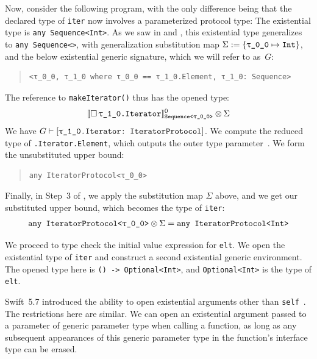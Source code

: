 \documentclass[../generics]{subfiles}
\begin{document}
\begin{example}
Now, consider the following program, with the only difference being that the declared type of \texttt{iter} now involves a parameterized protocol type:
The existential type is \texttt{any Sequence<Int>}. As we saw in  and , this existential type generalizes to \texttt{any Sequence<\rT>}, with generalization substitution map $\Sigma := \SubstMap{\SubstType{\rT}{Int}}$, and the below existential generic signature, which we will refer to as~$G$:
\begin{quote}
\begin{verbatim}
<τ_0_0, τ_1_0 where τ_0_0 == τ_1_0.Element, τ_1_0: Sequence>
\end{verbatim}
\end{quote}
The reference to \texttt{makeIterator()} thus has the opened type:
\[
\Exist{\rO.Iterator}^0_\texttt{Sequence<\rT>} \otimes \Sigma
\]
We have $G \vdash \ConfReq{\rO.Iterator}{IteratorProtocol}$. We compute the reduced type of \texttt{\rO.Iterator.Element}, which outputs the outer type parameter~\rT. We form the unsubstituted upper bound:
\begin{quote}
\begin{verbatim}
any IteratorProtocol<τ_0_0>
\end{verbatim}
\end{quote}
Finally, in Step~3 of , we apply the substitution map $\Sigma$ above, and we get our substituted upper bound, which becomes the type of \texttt{iter}:
\[
\texttt{any IteratorProtocol<\rT>} \otimes \Sigma = \texttt{any IteratorProtocol<Int>}
\]

We proceed to type check the initial value expression for \texttt{elt}. We open the existential type of \texttt{iter} and construct a second existential generic environment. The opened type here is \texttt{() -> Optional<Int>}, and \texttt{Optional<Int>} is the type of \texttt{elt}.
\end{example}

Swift~5.7 introduced the ability to open existential arguments other than \texttt{self}~\cite{se0352}. The restrictions here are similar. We can open an existential argument passed to a parameter of generic parameter type when calling a function, as long as any subsequent appearances of this generic parameter type in the function's interface type can be erased.
\end{document}
